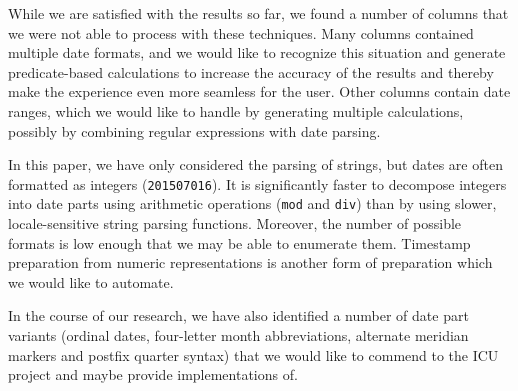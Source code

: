 While we are satisfied with the results so far, we found a number of columns that we were not able to process with these techniques. Many columns contained multiple date formats, and we would like to recognize this situation and generate predicate-based calculations to increase the accuracy of the results and thereby make the experience even more seamless for the user. Other columns contain date ranges, which we would like to handle by generating multiple calculations, possibly by combining regular expressions with date parsing.

In this paper, we have only considered the parsing of strings, but dates are often formatted as integers (\eg \texttt{201507016}). It is significantly faster to decompose integers into date parts using arithmetic operations (\eg \texttt{mod} and \texttt{div}) than by using slower, locale-sensitive string parsing functions. Moreover, the number of possible formats is low enough that we may be able to enumerate them. Timestamp preparation from numeric representations is another form of preparation which we would like to automate.

In the course of our research, we have also identified a number of date part variants (\eg ordinal dates, four-letter month abbreviations, alternate meridian markers and postfix quarter syntax) that we would like to commend to the ICU project and maybe provide implementations of.
